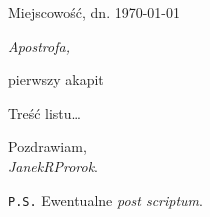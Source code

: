 \documentclass[11pt,oneside,notitlepage,a4paper]{mwart}
\begin{document}

\hfill Miejscowość, dn. \today
	\begin{center} \bigskip
		\noindent \emph{\huge{Apostrofa,}} %
	\end{center} \bigskip
	
\noindent pierwszy akapit\smallskip

Treść listu\ldots

\bigskip \hfill 
	\begin{minipage}{0.5\linewidth}
		\centering Pozdrawiam,\\\smallskip
 		\emph{JanekR\underline{\hspace{1.2ex}}Prorok}.
 	\end{minipage}

\bigskip\bigskip\bigskip
\texttt{P.S.} Ewentualne \emph{post scriptum}.
\end{document}
